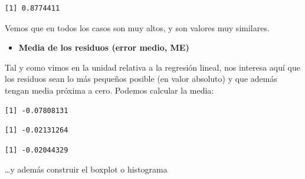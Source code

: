 \documentclass[
  letterpaper,
  DIV=11,
  numbers=noendperiod]{scrreprt}
\newenvironment{Shaded}{\begin{snugshade}}{\end{snugshade}}
\newcommand{\AttributeTok}[1]{\textcolor[rgb]{0.40,0.45,0.13}{#1}}
\newcommand{\CommentTok}[1]{\textcolor[rgb]{0.37,0.37,0.37}{#1}}
\newcommand{\FunctionTok}[1]{\textcolor[rgb]{0.28,0.35,0.67}{#1}}
\newcommand{\NormalTok}[1]{\textcolor[rgb]{0.00,0.23,0.31}{#1}}
\newcommand{\SpecialCharTok}[1]{\textcolor[rgb]{0.37,0.37,0.37}{#1}}
\newcommand{\StringTok}[1]{\textcolor[rgb]{0.13,0.47,0.30}{#1}}
\providecommand{\tightlist}{%
  \setlength{\itemsep}{0pt}\setlength{\parskip}{0pt}}\usepackage{longtable,booktabs,array}
\begin{document}
\begin{verbatim}
[1] 0.8774411
\end{verbatim}

Vemos que en todos los casos son muy altos, y son valores muy similares.

\begin{itemize}
\tightlist
\item
  \textbf{Media de los residuos (error medio, ME)}
\end{itemize}

Tal y como vimos en la unidad relativa a la regresión lineal, nos
interesa aquí que los residuos sean lo más pequeños posible (en valor
absoluto) y que además tengan media próxima a cero. Podemos calcular la
media:

\begin{Shaded}
\end{Shaded}

\begin{verbatim}
[1] -0.07808131
\end{verbatim}

\begin{Shaded}
\end{Shaded}

\begin{verbatim}
[1] -0.02131264
\end{verbatim}

\begin{Shaded}
\end{Shaded}

\begin{verbatim}
[1] -0.02044329
\end{verbatim}

\ldots y además construir el boxplot o histograma

\begin{Shaded}
\end{Shaded}
\end{document}
